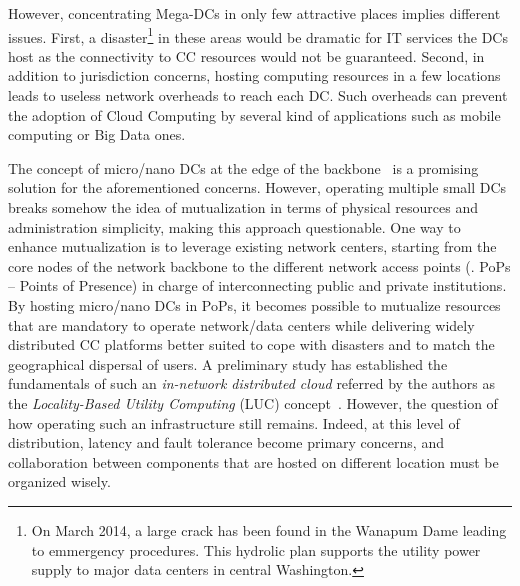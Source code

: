 However, concentrating Mega-DCs in only few attractive places implies different issues. First, a disaster\footnote{On March 2014, a large crack has
  been found in the Wanapum Dame leading to emmergency procedures. This hydrolic plan supports the utility power supply to major data centers in
  central Washington.} in these areas would be dramatic for IT services the DCs host as the connectivity to CC resources would not be
guaranteed. Second, in addition to jurisdiction concerns, hosting computing resources in a few locations leads to useless network overheads to reach
each DC. Such overheads can prevent the adoption of Cloud Computing by several kind of applications such as mobile computing or Big Data ones.


The concept of micro/nano DCs at the edge of the backbone~\cite{greenberg:2008} is a promising solution for the aforementioned concerns. However,
operating multiple small DCs breaks somehow the idea of mutualization in terms of physical resources and administration simplicity, making this
approach questionable. One way to enhance mutualization is to leverage existing network centers, starting from the core nodes of the network backbone
to the different network access points (\aka. PoPs – Points of Presence) in charge of interconnecting public and private institutions. By hosting
micro/nano DCs in PoPs, it becomes possible to mutualize resources that are mandatory to operate network/data centers while delivering widely
distributed CC platforms better suited to cope with disasters and to match the geographical dispersal of users. %
A preliminary study has established the fundamentals of such an \emph{in-network distributed cloud} referred by the authors as the
\emph{Locality-Based Utility Computing} (LUC) concept~\cite{lebre:beyond2013}. However, the question of how operating such an infrastructure still
remains. Indeed, at this level of distribution, latency and fault tolerance become primary concerns, and collaboration between components that are
hosted on different location must be organized wisely.

